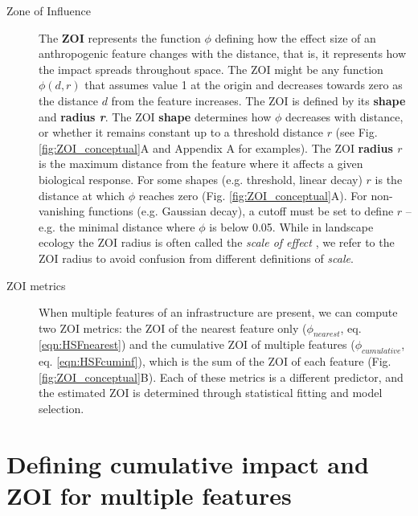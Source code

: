 \documentclass[titlepage]{article}
\begin{document}
\begin{tcolorbox}[width=1.3\textwidth,center,colback=yellow!5,colframe=yellow!75!black,title={Box 1 -- Definitions}]
\begin{description}
    \item[Zone of Influence] The \textbf{ZOI} represents the function $\phi$ defining how the effect size of an anthropogenic feature changes with the distance, that is, it represents how the impact spreads throughout space. The ZOI might be any function $\phi(d, r)$ that assumes value 1 at the origin and decreases towards zero as the distance $d$ from the feature increases. The ZOI is defined by its \textbf{shape} and \textbf{radius \textit{r}}. The ZOI \textbf{shape} determines how $\phi$ decreases with distance, or whether it remains constant up to a threshold distance $r$ (see Fig. \ref{fig:ZOI_conceptual}A and Appendix A for examples). The ZOI \textbf{radius $r$} is the maximum distance from the feature where it affects a given biological response. For some shapes (e.g. threshold, linear decay) $r$ is the distance at which $\phi$ reaches zero (Fig. \ref{fig:ZOI_conceptual}A). For non-vanishing functions (e.g. Gaussian decay), a cutoff must be set to define $r$ -- e.g. the minimal distance where $\phi$ is below 0.05. 
    While in landscape ecology the ZOI radius is often called the \textit{scale of effect} \citep[e.g.][]{moraga_scale_2019}, we refer to the ZOI radius to avoid confusion from different definitions of \textit{scale}.
    
    \item[ZOI metrics] When multiple features of an infrastructure are present, we can compute two ZOI metrics: the ZOI of the nearest feature only ($\phi_{nearest}$, eq. \ref{eqn:HSFnearest}) and the cumulative ZOI of multiple features ($\phi_{cumulative}$, eq. \ref{eqn:HSFcuminf}), which is the sum of the ZOI of each feature (Fig. \ref{fig:ZOI_conceptual}B). Each of these metrics is a different predictor, and the estimated ZOI is determined through statistical fitting and model selection.
    
\end{description}
\end{tcolorbox}

\section{Defining cumulative impact and ZOI for multiple features}
\end{document}
